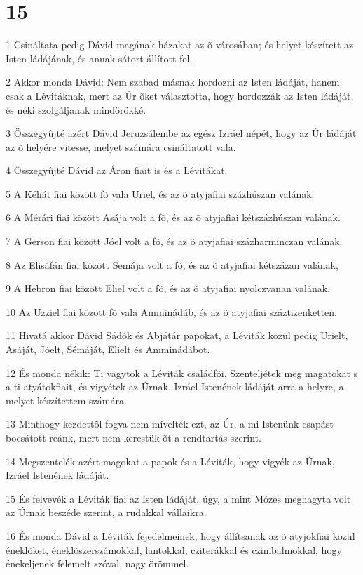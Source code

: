 \chapter{15}

\par 1 Csináltata pedig Dávid magának házakat az õ városában; és helyet készített az Isten ládájának, és annak sátort állított fel.
\par 2 Akkor monda Dávid: Nem szabad másnak hordozni az Isten ládáját, hanem csak a Lévitáknak, mert az Úr õket választotta, hogy hordozzák az Isten ládáját, és néki szolgáljanak mindörökké.
\par 3 Összegyûjté azért Dávid Jeruzsálembe az egész Izráel népét, hogy az Úr ládáját az õ helyére vitesse, melyet számára csináltatott vala.
\par 4 Összegyûjté Dávid az Áron fiait is és a Lévitákat.
\par 5 A Kéhát fiai között fõ vala Uriel, és az õ atyjafiai százhúszan valának.
\par 6 A Mérári fiai között Asája volt a fõ, és az õ atyjafiai kétszázhúszan valának.
\par 7 A Gerson fiai között Jóel volt a fõ, és az õ atyjafiai százharminczan valának.
\par 8 Az Elisáfán fiai között Semája volt a fõ, és az õ atyjafiai kétszázan valának,
\par 9 A Hebron fiai között Eliel volt a fõ, és az õ atyjafiai nyolczvanan valának.
\par 10 Az Uzziel fiai között fõ vala Amminádáb, és az õ atyjafiai száztizenketten.
\par 11 Hivatá akkor Dávid Sádók és Abjátár papokat, a Léviták közül pedig Urielt, Asáját, Jóelt, Sémáját, Elielt és Amminádábot.
\par 12 És monda nékik: Ti vagytok a Léviták családfõi. Szenteljétek meg magatokat s a ti atyátokfiait, és vigyétek az Úrnak, Izráel Istenének ládáját arra a helyre, a melyet készítettem számára.
\par 13 Minthogy kezdettõl fogva nem mívelték ezt, az Úr, a mi Istenünk csapást bocsátott reánk, mert nem kerestük õt a rendtartás szerint.
\par 14 Megszentelék azért magokat a papok és a Léviták, hogy vigyék az Úrnak, Izráel Istenének ládáját.
\par 15 És felvevék a Léviták fiai az Isten ládáját, úgy, a mint Mózes meghagyta volt az Úrnak beszéde szerint, a rudakkal vállaikra.
\par 16 És monda Dávid a Léviták fejedelmeinek, hogy állítsanak az õ atyjokfiai közül éneklõket, éneklõszerszámokkal, lantokkal, cziterákkal és czimbalmokkal, hogy énekeljenek felemelt szóval, nagy örömmel.
